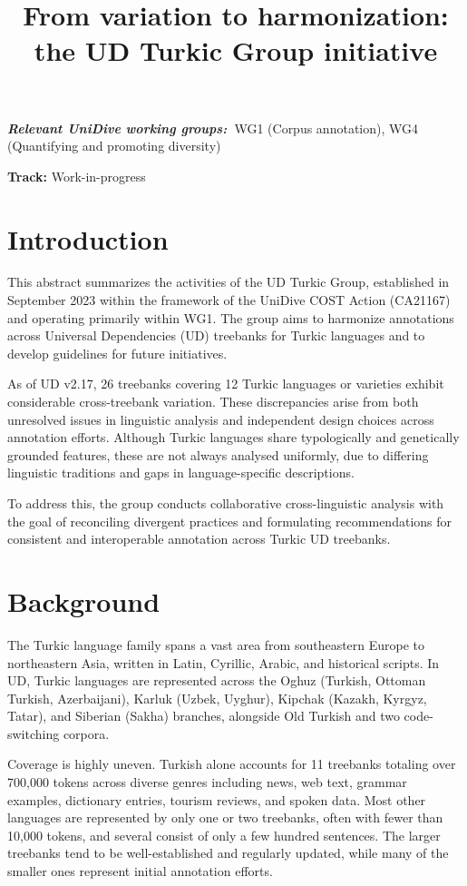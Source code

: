 \documentclass[11pt,a4paper]{article}
\title{From variation to harmonization: the UD Turkic Group initiative}
\author{}
\providecommand{\wgs}[1]{%
  \noindent\begin{small}\textbf{\textit{Relevant UniDive working groups:~}}#1\end{small}%
}
\begin{document}
\maketitle

\wgs{WG1 (Corpus annotation), WG4 (Quantifying and promoting diversity)}

\noindent\textbf{Track:} Work-in-progress

\section{Introduction}

This abstract summarizes the activities of the UD Turkic Group, established in September 2023 within the framework of the UniDive COST Action (CA21167) and operating primarily within WG1. The group aims to harmonize annotations across Universal Dependencies (UD) treebanks for Turkic languages and to develop guidelines for future initiatives.

As of UD v2.17, 26 treebanks covering 12 Turkic languages or varieties exhibit considerable cross-treebank variation. These discrepancies arise from both unresolved issues in linguistic analysis and independent design choices across annotation efforts. Although Turkic languages share typologically and genetically grounded features, these are not always analysed uniformly, due to differing linguistic traditions and gaps in language-specific descriptions.

To address this, the group conducts collaborative cross-linguistic analysis with the goal of reconciling divergent practices and formulating recommendations for consistent and interoperable annotation across Turkic UD treebanks.

\section{Background}

The Turkic language family spans a vast area from southeastern Europe to northeastern Asia, written in Latin, Cyrillic, Arabic, and historical scripts. In UD, Turkic languages are represented across the Oghuz (Turkish, Ottoman Turkish, Azerbaijani), Karluk (Uzbek, Uyghur), Kipchak (Kazakh, Kyrgyz, Tatar), and Siberian (Sakha) branches, alongside Old Turkish and two code-switching corpora.

Coverage is highly uneven. Turkish alone accounts for 11 treebanks totaling over 700,000 tokens across diverse genres including news, web text, grammar examples, dictionary entries, tourism reviews, and spoken data. Most other languages are represented by only one or two treebanks, often with fewer than 10,000 tokens, and several consist of only a few hundred sentences. The larger treebanks tend to be well-established and regularly updated, while many of the smaller ones represent initial annotation efforts.
\end{document}
